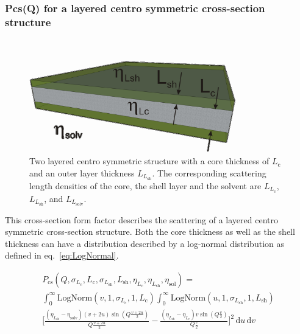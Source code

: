 \clearpage
\subsubsection{Pcs(Q) for a layered centro symmetric cross-section structure} ~\\
\label{plugin:Pcs:LayeredCentroSymmetricCrossSectionStructure}

\begin{figure}[htb]
\begin{center}
\includegraphics[width=0.8\textwidth,height=0.361\textwidth]{../images/form_factor/anisotropic/planar2centrosymm_txt.png}
\end{center}
\caption{Two layered centro symmetric structure with a core thickness of $L_\textrm{c}$ and an outer layer thickness
$L_{L_\textrm{sh}}$. The corresponding scattering length densities of the core, the shell layer and the solvent are
$L_{L_\textrm{c}}$, $L_{L_\textrm{sh}}$, and $L_{L_\textrm{solv}}$.}
\label{fig:Pcs:TwoInfinitelyThinLayers}
\end{figure}

This cross-section form factor describes the scattering of a layered centro symmetric cross-section structure.
Both the core thickness as well as the shell thickness can have a distribution described by a log-normal distribution as defined in eq.\ \ref{eq:LogNormal}.

\begin{multline}
P_\text{cs}(Q,\sigma_{L_\textrm{c}},L_\textrm{c},\sigma_{L_\textrm{sh}},L_\textrm{sh},\eta_{L_\textrm{c}},\eta_{L_\textrm{sh}},\eta_\textrm{sol}) = \\
\int_0^\infty \textrm{LogNorm}(v,1,\sigma_{L_\textrm{c}},1,L_\textrm{c})
\int_0^\infty \textrm{LogNorm}(u,1,\sigma_{L_\textrm{sh}},1,L_\textrm{sh}) \\
     \Bigg[ \frac{(\eta_{L_\textrm{sh}}-\eta_\textrm{solv})(v+2u) \sin\left(Q\frac{v+2u}{2}\right)}{Q\frac{v+2u}{2}}
          -\frac{(\eta_{L_\textrm{sh}}-\eta_{L_\textrm{c}})  v   \sin\left(Q \frac{v}{2}\right)}{Q \frac{v}{2}}
    \Bigg]^2 \,
\textrm{d}u \, \textrm{d}v
\end{multline}

